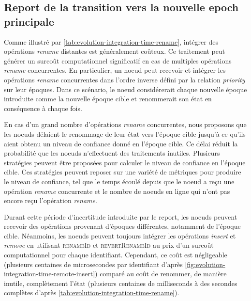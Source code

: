 \documentclass[12pt]{thesul}
\begin{document}
\subsection{Report de la transition vers la nouvelle epoch principale}

Comme illustré par \autoref{tab:evolution-integration-time-rename}, intégrer des opérations \emph{rename} distantes est généralement coûteux.
Ce traitement peut générer un surcoût computationnel significatif en cas de multiples opérations \emph{rename} concurrentes.
En particulier, un noeud peut recevoir et intégrer les opérations \emph{rename} concurrentes dans l'ordre inverse défini par la relation \emph{priority} sur leur époques.
Dans ce scénario, le noeud considérerait chaque nouvelle époque introduite comme la nouvelle époque cible et renommerait son état en conséquence à chaque fois.


En cas d'un grand nombre d'opérations \emph{rename} concurrentes, nous proposons que les noeuds délaient le renommage de leur état vers l'époque cible jusqu'à ce qu'ils aient obtenu un niveau de confiance donné en l'époque cible.
Ce délai réduit la probabilité que les noeuds n'effectuent des traitements inutiles.
Plusieurs stratégies peuvent être proposées pour calculer le niveau de confiance en l'époque cible.
Ces stratégies peuvent reposer sur une variété de métriques pour produire le niveau de confiance, tel que le temps écoulé depuis que le noeud a reçu une opération \emph{rename} concurrente et le nombre de noeuds en ligne qui n'ont pas encore reçu l'opération \emph{rename}.

Durant cette période d'incertitude introduite par le report, les noeuds peuvent recevoir des opérations provenant d'époques différentes, notamment de l'époque cible.
Néanmoins, les noeuds peuvent toujours intégrer les opérations \emph{insert} et \emph{remove} en utilisant \textsc{renameId} et \textsc{revertRenameId} au prix d'un surcoût computationnel pour chaque identifiant.
Cependant, ce coût est négligeable (plusieurs centaines de microsecondes par identifiant d'après \autoref{fig:evolution-integration-time-remote-insert}) comparé au coût de renommer, de manière inutile, complètement l'état (plusieurs centaines de milliseconds à des secondes complètes d'après \autoref{tab:evolution-integration-time-rename}).
\end{document}
